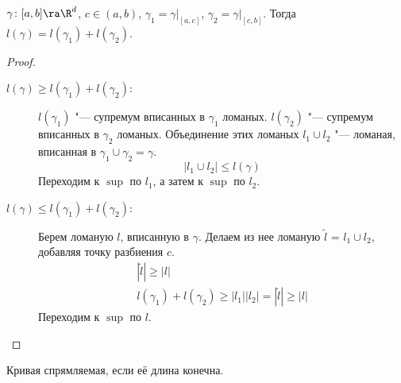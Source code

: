 \begin{theorem}
	$\gamma \colon [a, b] \ra \R^d$, $c \in (a,b)$, $\gamma_1 = \gamma\bigr|_{[a,c]}$, $\gamma_2 = \gamma\bigr|_{[c,b]}$.
	Тогда $l(\gamma) = l(\gamma_1) + l(\gamma_2)$.
\end{theorem}

\begin{proof}
	\begin{description}
	\item[$l(\gamma) \ge l(\gamma_1) + l(\gamma_2)$:]
		$l(\gamma_1)$ "--- супремум вписанных в $\gamma_1$ ломаных.
		$l(\gamma_2)$ "--- супремум вписанных в $\gamma_2$ ломаных.
		Объединение этих ломаных $l_1 \cup l_2$ "--- ломаная, вписанная в $\gamma_1 \cup \gamma_2 = \gamma$.
		\[ |l_1 \cup l_2| \le l(\gamma) \]
		Переходим к $\sup$ по $l_1$, а затем к $\sup$ по $l_2$.

	\item[$l(\gamma) \le l(\gamma_1) + l(\gamma_2)$:]
		Берем ломаную $l$, вписанную в $\gamma$.
		Делаем из нее ломаную $\tilde l$ = $l_1 \cup l_2$, добавляя точку разбиения $c$.
		\begin{gather*}
			|\tilde l| \ge |l| \\
			l(\gamma_1) + l(\gamma_2) \ge |l_1| |l_2| = |\tilde l| \ge |l|
		\end{gather*}
		Переходим к $\sup$ по $l$.
	\end{description}
\end{proof}

\begin{Def}
	Кривая спрямляемая, если её длина конечна.
\end{Def}

